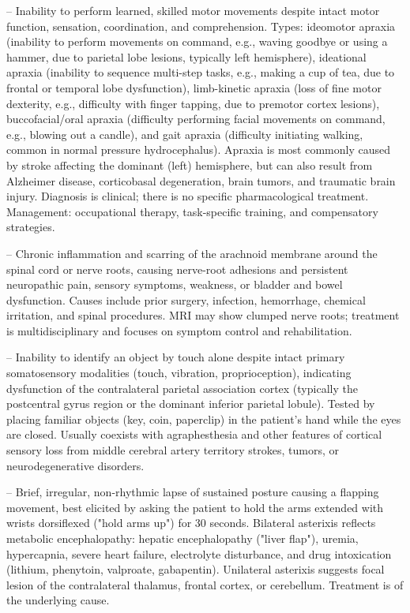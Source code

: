 -- Inability to perform learned, skilled motor movements despite intact motor function, sensation, coordination, and comprehension. Types: ideomotor apraxia (inability to perform movements on command, e.g., waving goodbye or using a hammer, due to parietal lobe lesions, typically left hemisphere), ideational apraxia (inability to sequence multi-step tasks, e.g., making a cup of tea, due to frontal or temporal lobe dysfunction), limb-kinetic apraxia (loss of fine motor dexterity, e.g., difficulty with finger tapping, due to premotor cortex lesions), buccofacial/oral apraxia (difficulty performing facial movements on command, e.g., blowing out a candle), and gait apraxia (difficulty initiating walking, common in normal pressure hydrocephalus). Apraxia is most commonly caused by stroke affecting the dominant (left) hemisphere, but can also result from Alzheimer disease, corticobasal degeneration, brain tumors, and traumatic brain injury. Diagnosis is clinical; there is no specific pharmacological treatment. Management: occupational therapy, task-specific training, and compensatory strategies.

-- Chronic inflammation and scarring of the arachnoid membrane around the spinal cord or nerve roots, causing nerve-root adhesions and persistent neuropathic pain, sensory symptoms, weakness, or bladder and bowel dysfunction. Causes include prior surgery, infection, hemorrhage, chemical irritation, and spinal procedures. MRI may show clumped nerve roots; treatment is multidisciplinary and focuses on symptom control and rehabilitation.

-- Inability to identify an object by touch alone despite intact primary somatosensory modalities (touch, vibration, proprioception), indicating dysfunction of the contralateral parietal association cortex (typically the postcentral gyrus region or the dominant inferior parietal lobule). Tested by placing familiar objects (key, coin, paperclip) in the patient's hand while the eyes are closed. Usually coexists with agraphesthesia and other features of cortical sensory loss from middle cerebral artery territory strokes, tumors, or neurodegenerative disorders.

-- Brief, irregular, non-rhythmic lapse of sustained posture causing a flapping movement, best elicited by asking the patient to hold the arms extended with wrists dorsiflexed ("hold arms up") for 30 seconds. Bilateral asterixis reflects metabolic encephalopathy: hepatic encephalopathy ("liver flap"), uremia, hypercapnia, severe heart failure, electrolyte disturbance, and drug intoxication (lithium, phenytoin, valproate, gabapentin). Unilateral asterixis suggests focal lesion of the contralateral thalamus, frontal cortex, or cerebellum. Treatment is of the underlying cause.

